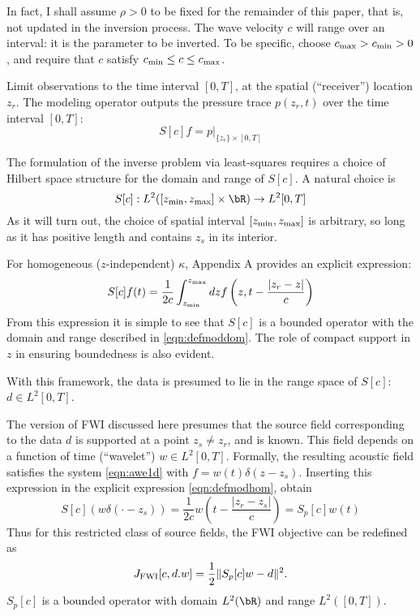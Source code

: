 In fact, I shall assume $\rho>0$ to be fixed for the remainder of this
paper, that is, not updated in the inversion process. The wave
velocity $c$ will range over an interval: it is the parameter to be inverted.
To be specific, choose $c_{\rm max} > c_{\rm min} > 0$, and require
that $c$ satisfy $c_{\rm min} \le c \le c_{\rm max}$.

Limit observations to the time interval $[0,T]$, at the spatial (``receiver'')  location $z_r$. The modeling operator outputs the pressure trace $p(z_r,t)$ over the time interval $[0,T]$:
\begin{equation}
  \label{eqn:defmod}
  S[c]f = p|_{\{z_r\}\times [0,T]}
\end{equation}

The formulation of the inverse problem via least-squares requires a choice of Hilbert space structure for the domain and range of $S[c]$. A natural choice is
\begin{equation}
  \label{eqn:defmoddom}
  S[c]: L^2([z_{\rm min},z_{\rm max}] \times \bR) \rightarrow L^2[0,T]
\end{equation}
As it will turn out, the choice of spatial interval $[z_{\rm min},z_{\rm max}]$ is arbitrary, so long as it has positive length and contains $z_s$ in its interior. 

For homogeneous ($z$-independent) $\kappa$, Appendix A provides an explicit expression:
\begin{equation}
  \label{eqn:defmodhom}
  S[c]f(t) = \frac{1}{2c}\int_{z_{\rm min}}^{z_{\rm max}} dz f\left(z,t - \frac{|z_r-z|}{c}\right) 
\end{equation}
From this expression it is simple to see that $S[c]$ is a bounded
operator with the domain and range described in
\ref{eqn:defmoddom}. The role of compact support in $z$ in ensuring
boundedness is also evident. %

With this framework, the data is presumed to lie in the range space of $S[c]$: $d \in L^2[0,T]$.

The version of FWI discussed here presumes that the source field corresponding to the data $d$ is supported at a point $z_s \ne z_r$, and is known. This field depends on a function of time (``wavelet'') $w \in L^2[0,T]$. Formally, the resulting acoustic field satisfies the system \ref{eqn:awe1d} with $f=w(t)\delta(z-z_s)$. Inserting this expression in the explicit expression \ref{eqn:defmodhom}, obtain
\begin{equation}
  \label{eqn:defmodpt}
  S[c](w\delta(\cdot-z_s)) = \frac{1}{2c}w\left(t - \frac{|z_r-z_s|}{c}\right) = S_p[c]w(t)
\end{equation}
Thus for this restricted class of source fields, the FWI objective can be redefined as
\begin{equation}
  \label{eqn:deffwipt}
  J_{\rm FWI}[c,d.w] = \frac{1}{2}\|S_p[c]w -d\|^2.
\end{equation}
$S_p[c]$ is a bounded operator with domain $L^2(\bR)$ and range $L^2([0,T])$. 

